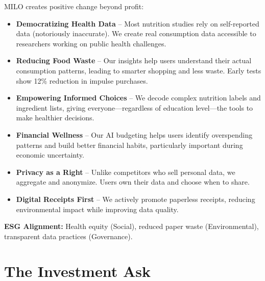 \documentclass[11pt,a4paper]{report}
\begin{document}
MILO creates positive change beyond profit:

\begin{itemize}[leftmargin=2em, itemsep=6pt]
    \item \textbf{Democratizing Health Data} -- Most nutrition studies rely on self-reported data (notoriously inaccurate). We create real consumption data accessible to researchers working on public health challenges.

    \item \textbf{Reducing Food Waste} -- Our insights help users understand their actual consumption patterns, leading to smarter shopping and less waste. Early tests show 12\% reduction in impulse purchases.

    \item \textbf{Empowering Informed Choices} -- We decode complex nutrition labels and ingredient lists, giving everyone---regardless of education level---the tools to make healthier decisions.

    \item \textbf{Financial Wellness} -- Our AI budgeting helps users identify overspending patterns and build better financial habits, particularly important during economic uncertainty.

    \item \textbf{Privacy as a Right} -- Unlike competitors who sell personal data, we aggregate and anonymize. Users own their data and choose when to share.

    \item \textbf{Digital Receipts First} -- We actively promote paperless receipts, reducing environmental impact while improving data quality.
\end{itemize}

\textbf{ESG Alignment:} Health equity (Social), reduced paper waste (Environmental), transparent data practices (Governance).

\section{The Investment Ask}
\end{document}
